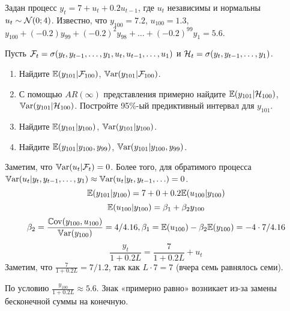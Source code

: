 \begin{problem}
Задан процесс $y_t = 7 + u_t + 0.2 u_{t-1}$, где $u_t$ независимы и нормальны $u_t \sim \mathcal{N}(0;4)$. Известно, что $y_{100}=7.2$, $u_{100}=1.3$, $y_{100}+(-0.2)y_{99}+(-0.2)^2y_{98}+\ldots+(-0.2)^{99}y_1=5.6$.

Пусть $\mathcal{F}_t=\sigma(y_t, y_{t-1}, \ldots, y_1, u_t, u_{t-1}, \ldots, u_1)$ и $\mathcal{H}_t = \sigma(y_t, y_{t-1}, \ldots, y_1)$.
\begin{enumerate}
  \item Найдите $\mathbb{E}(y_{101}|\mathcal{F}_{100})$, $\mathbb{V}\mathrm{ar}(y_{101}|\mathcal{F}_{100})$.
  \item С помощью $AR(\infty)$ представления примерно найдите $\mathbb{E}(y_{101}|\mathcal{H}_{100})$, $\mathbb{V}\mathrm{ar}(y_{101}|\mathcal{H}_{100})$. Постройте 95\%-ый предиктивный интервал для $y_{101}$.
  \item Найдите $\mathbb{E}(y_{101}|y_{100})$, $\mathbb{V}\mathrm{ar}(y_{101}|y_{100})$.
  \item Найдите $\mathbb{E}(y_{101}|y_{100}, y_{99})$, $\mathbb{V}\mathrm{ar}(y_{101}|y_{100}, y_{99})$.
\end{enumerate}

\begin{sol}
Заметим, что $\mathbb{V}\mathrm{ar}(u_t|\mathcal{F}_t)=0$. Более того, для обратимого процесса $\mathbb{V}\mathrm{ar}(u_t|y_t, y_{t-1}, \ldots, y_1) \approx \mathbb{V}\mathrm{ar}(u_t|y_t, y_{t-1}, \ldots) = 0$.
\[
\mathbb{E}(y_{101}|y_{100})=7 + 0 + 0.2\mathbb{E}(u_{100}|y_{100})
\]
\[
\mathbb{E}(u_{100}|y_{100}) = \beta_1 + \beta_2 y_{100}
\]
\[
\beta_2 = \frac{\mathbb{C}\mathrm{ov}(y_{100}, u_{100})}{\mathbb{V}\mathrm{ar}(y_{100})}=4/4.16, \beta_1 = \mathbb{E}(u_{100}) - \beta_2 \mathbb{E}(y_{100})=-4\cdot 7/4.16
\]
\[
\frac{y_t}{1+0.2L} = \frac{7}{1+0.2L} + u_t
\]
Заметим, что $\frac{7}{1+0.2L}=7/1.2$, так как $L\cdot 7 = 7$ (вчера семь равнялось семи).

По условию $\frac{y_{100}}{1+0.2L} \approx 5.6$. Знак «примерно равно» возникает из-за замены бесконечной суммы на конечную.

\end{sol}
\end{problem}



